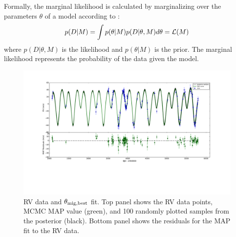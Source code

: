 Formally, the marginal likelihood is calculated by marginalizing over the parameters $\theta$ of a model according to \citep{Gregory2005}:
\begin{equation}
p(D|M) = \int p(\theta|M)p(D|\theta,M)d\theta = \mathcal{L}(M)
\label{eq:GL}
\end{equation}
where $p(D|\theta, M)$ is the likelihood and $p(\theta|M)$ is the prior. 
The marginal likelihood represents the probability of the data given the model. 

\begin{figure}
\includegraphics[trim=4.4cm 7cm 4.5cm 0cm, width=\textwidth]{chap6/images/taueinner_migrate3e+03_Kin7e+00_Kout3e+02_sd931}
\caption{RV data and $\theta_{\rm mig,best}$ fit.
Top panel shows the RV data points, MCMC MAP value (green), and 100 randomly plotted samples from the posterior (black). 
Bottom panel shows the residuals for the MAP fit to the RV data. 
 }
\label{fig:bestform}
\end{figure}

